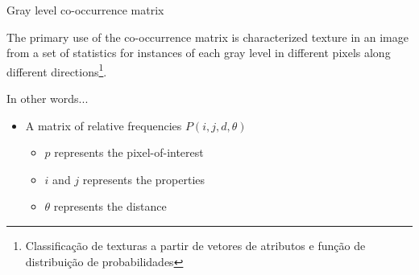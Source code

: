 \documentclass[notes]{beamer}
\begin{document}
\begin{frame}

\begin{block}{Gray level co-occurrence matrix}

The primary use of the co-occurrence matrix is characterized texture in an image from a set of statistics for instances of each gray level in different pixels
along different directions\footnote{Classificação de texturas a partir de vetores de atributos e função de distribuição de probabilidades\cite{Rocha}}.

\end{block}

\begin{block}{In other words...}

\begin{itemize}

\item A matrix of relative frequencies $P (i, j, d, \theta)$

\begin{itemize}

\item $p$ represents the pixel-of-interest

\item $i$ and $j$ represents the properties

\item $\theta$ represents the distance

\end{itemize}

\end{itemize}

\end{block}

{\let\thefootnote\relax\footnotetext{}}

\end{frame}
\end{document}
